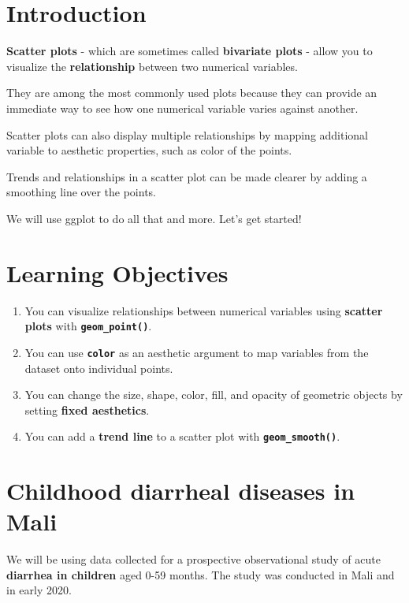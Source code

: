 \documentclass[
  letterpaper,
  DIV=11,
  numbers=noendperiod]{scrreprt}
\providecommand{\tightlist}{%
  \setlength{\itemsep}{0pt}\setlength{\parskip}{0pt}}\usepackage{longtable,booktabs,array}
\begin{document}
\section{Introduction}\label{introduction-13}

\textbf{Scatter plots} - which are sometimes called \textbf{bivariate
plots} - allow you to visualize the \textbf{relationship} between two
numerical variables.

They are among the most commonly used plots because they can provide an
immediate way to see how one numerical variable varies against another.

Scatter plots can also display multiple relationships by mapping
additional variable to aesthetic properties, such as color of the
points.

Trends and relationships in a scatter plot can be made clearer by adding
a smoothing line over the points.

We will use ggplot to do all that and more. Let's get started!

\section{Learning Objectives}\label{learning-objectives-15}

\begin{enumerate}
\def\labelenumi{\arabic{enumi}.}
\tightlist
\item
  You can visualize relationships between numerical variables using
  \textbf{scatter plots} with \textbf{\texttt{geom\_point()}}.
\item
  You can use \textbf{\texttt{color}} as an aesthetic argument to map
  variables from the dataset onto individual points.
\item
  You can change the size, shape, color, fill, and opacity of geometric
  objects by setting \textbf{fixed aesthetics}.
\item
  You can add a \textbf{trend line} to a scatter plot with
  \textbf{\texttt{geom\_smooth()}}.
\end{enumerate}

\section{Childhood diarrheal diseases in
Mali}\label{childhood-diarrheal-diseases-in-mali}

We will be using data collected for a prospective observational study of
acute \textbf{diarrhea in children} aged 0-59 months. The study was
conducted in Mali and in early 2020.
\end{document}
